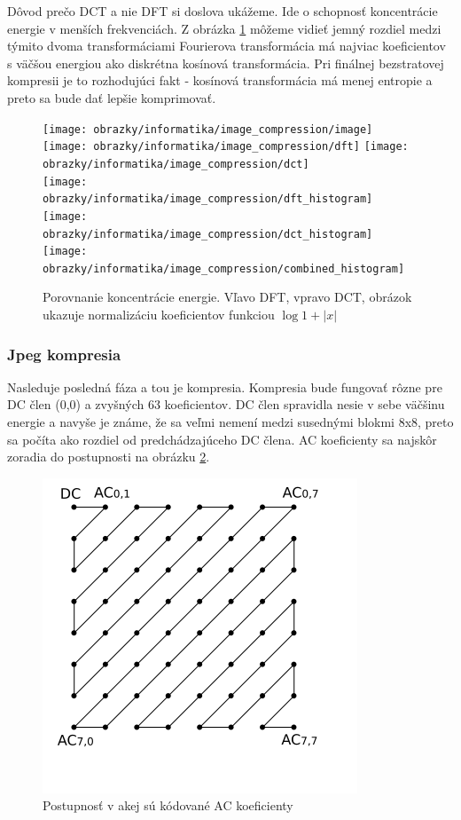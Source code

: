  Dôvod  prečo DCT a nie DFT si doslova ukážeme.
 Ide o schopnosť koncentrácie energie
 v menších frekvenciách. Z obrázka \ref{fig:dct_vs_dft}
 môžeme vidieť jemný rozdiel medzi týmito dvoma transformáciami
 Fourierova transformácia má najviac koeficientov s väčšou energiou
 ako diskrétna kosínová transformácia. Pri finálnej
 bezstratovej kompresii je to rozhodujúci fakt - kosínová
 transformácia má menej entropie a preto sa bude dať lepšie
 komprimovať.

 
\begin{figure}[htp]
    \centering
    \texttt{[image: obrazky/informatika/image\_compression/image]} \\
    \texttt{[image: obrazky/informatika/image\_compression/dft]}
    \texttt{[image: obrazky/informatika/image\_compression/dct]} \\
    \texttt{[image: obrazky/informatika/image\_compression/dft\_histogram]}
    \texttt{[image: obrazky/informatika/image\_compression/dct\_histogram]}
    \texttt{[image: obrazky/informatika/image\_compression/combined\_histogram]}
    \caption{Porovnanie koncentrácie energie. Vľavo DFT, vpravo DCT,
    obrázok ukazuje normalizáciu koeficientov funkciou $\log 1+|x|$}
    \label{fig:dct_vs_dft}
\end{figure}

\subsubsection{Jpeg kompresia }
Nasleduje posledná fáza a tou je kompresia. Kompresia bude fungovať
rôzne pre DC člen (0,0) a zvyšných 63 koeficientov. DC člen spravidla nesie v
sebe väčšinu energie a navyše je známe, že sa veľmi nemení medzi
susednými blokmi 8x8, preto sa počíta ako rozdiel od predchádzajúceho
DC člena. AC koeficienty sa najskôr zoradia do 
postupnosti na obrázku \ref{fig:jpeg_zig_zag}. 

\begin{figure}[htp]
    \centering
    \includegraphics{obrazky/informatika/image_compression/zig_zag}
    \caption{Postupnosť v akej sú kódované AC koeficienty}
    \label{fig:jpeg_zig_zag}
\end{figure}

